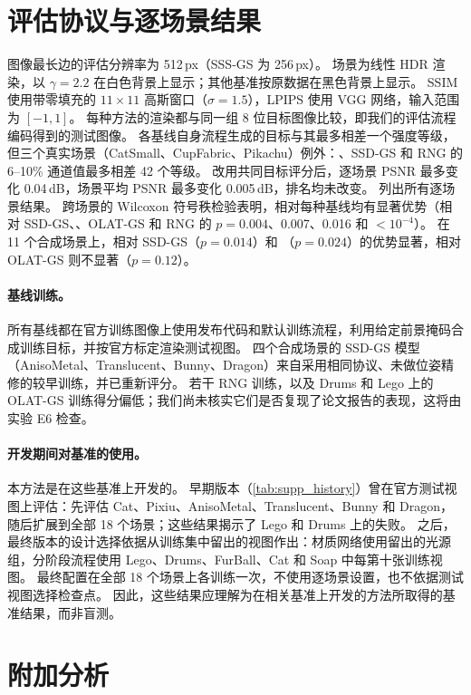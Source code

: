 \documentclass[10pt,twocolumn,letterpaper]{article}
\begin{document}
\section{评估协议与逐场景结果}
\label{sec:s_eval}
图像最长边的评估分辨率为 512\,px（SSS-GS 为 256\,px）。
\gsthree 场景为线性 HDR 渲染，以 $\gamma=2.2$ 在白色背景上显示；其他基准按原数据在黑色背景上显示。
SSIM 使用带零填充的 $11\times11$ 高斯窗口（$\sigma=1.5$），LPIPS 使用 VGG 网络，输入范围为 $[-1,1]$。
每种方法的渲染都与同一组 8 位目标图像比较，即我们的评估流程编码得到的测试图像。
各基线自身流程生成的目标与其最多相差一个强度等级，但三个真实场景（CatSmall、CupFabric、Pikachu）例外：\gsthree、SSD-GS 和 RNG 的 6--10\% 通道值最多相差 42 个等级。
改用共同目标评分后，逐场景 PSNR 最多变化 0.04\,dB，场景平均 PSNR 最多变化 0.005\,dB，排名均未改变。
 列出所有逐场景结果。
跨场景的 Wilcoxon 符号秩检验表明，\ours 相对每种基线均有显著优势（相对 SSD-GS、\gsthree、OLAT-GS 和 RNG 的 $p=0.004$、0.007、0.016 和 $<10^{-4}$）。
在 11 个合成场景上，相对 SSD-GS（$p=0.014$）和 \gsthree（$p=0.024$）的优势显著，相对 OLAT-GS 则不显著（$p=0.12$）。

\paragraph{基线训练。}
所有基线都在官方训练图像上使用发布代码和默认训练流程，利用给定前景掩码合成训练目标，并按官方标定渲染测试视图。
四个合成场景的 SSD-GS 模型（AnisoMetal、Translucent、Bunny、Dragon）来自采用相同协议、未做位姿精修的较早训练，并已重新评分。
若干 RNG 训练，以及 Drums 和 Lego 上的 OLAT-GS 训练得分偏低；我们尚未核实它们是否复现了论文报告的表现，这将由实验 E6 检查。

\paragraph{开发期间对基准的使用。}
本方法是在这些基准上开发的。
早期版本（\cref{tab:supp_history}）曾在官方测试视图上评估：先评估 Cat、Pixiu、AnisoMetal、Translucent、Bunny 和 Dragon，随后扩展到全部 18 个场景；这些结果揭示了 Lego 和 Drums 上的失败。
之后，最终版本的设计选择依据从训练集中留出的视图作出：材质网络使用留出的光源组，分阶段流程使用 Lego、Drums、FurBall、Cat 和 Soap 中每第十张训练视图。
最终配置在全部 18 个场景上各训练一次，不使用逐场景设置，也不依据测试视图选择检查点。
因此，这些结果应理解为在相关基准上开发的方法所取得的基准结果，而非盲测。



\section{附加分析}
\label{sec:s_analysis}
\end{document}
